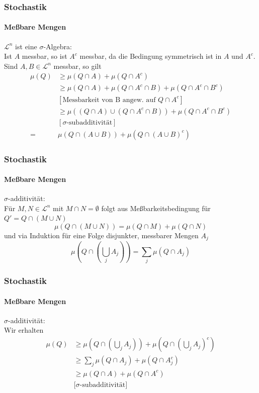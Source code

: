 \documentclass{beamer}
\begin{document}
\begin{frame}
    \frametitle{Stochastik}
\framesubtitle{Meßbare Mengen}
$\mathcal{L}^n$ ist eine $\sigma$-Algebra: \\
Ist $A$ messbar, so ist $A^c$ messbar, da die Bedingung symmetrisch ist in $A$ und $A^c$. \\
Sind $A, B \in \mathcal{L}^n$ messbar, so gilt 
\begin{align*}
    \mu(Q)  & \geq \mu(Q \cap A) +  \mu(Q \cap A^c) \\
    & \geq \mu(Q \cap A ) + \mu(Q \cap A^c  \cap B) + \mu(Q \cap A^c  \cap B^c) \\
    & [\text{Messbarkeit von B angew. auf $Q\cap A^c$}] \\
    & \geq \mu((Q \cap A)  \cup (Q \cap A^c  \cap B)) + \mu(Q \cap A^c  \cap B^c) \\
    & [\text{$\sigma$-subadditivität}] \\
= & \mu(Q \cap (A \cup B))+  \mu(Q \cap (A \cup B)^c) 
\end{align*}
\; \; \; \; \; \; \;     
\end{frame}

\begin{frame}
    \frametitle{Stochastik}
\framesubtitle{Meßbare Mengen}
$\sigma$-additivität: \\
Für $M,N \in \mathcal{L}^n$ mit $M \cap N = \emptyset$ folgt aus Meßbarkeitsbedingung für $Q' = Q \cap (M \cup N)$
$$ \mu (Q \cap (M \cup N)) = \mu (Q \cap M) +  \mu (Q \cap N)$$
und via Induktion für eine Folge disjunkter, messbarer Mengen $A_j$
$$ \mu (Q \cap (\bigcup_j A_j)) = \sum_j \mu (Q \cap A_j)$$

\end{frame}



\begin{frame}
    \frametitle{Stochastik}
\framesubtitle{Meßbare Mengen}
$\sigma$-additivität: \\
Wir erhalten 
\begin{align*}
    \mu(Q) & \geq \mu(Q \cap (\bigcup_j A_j)) + \mu(Q \cap (\bigcup_j A_j)^c) \\
    & \geq \sum_j \mu(Q \cap A_j) + \mu(Q \cap A_j^c) \\
    & \geq \mu(Q \cap A) + \mu(Q \cap A^c) \\
    & \text{[$\sigma$-subadditivität]}
\end{align*}
\end{frame}
\end{document}

